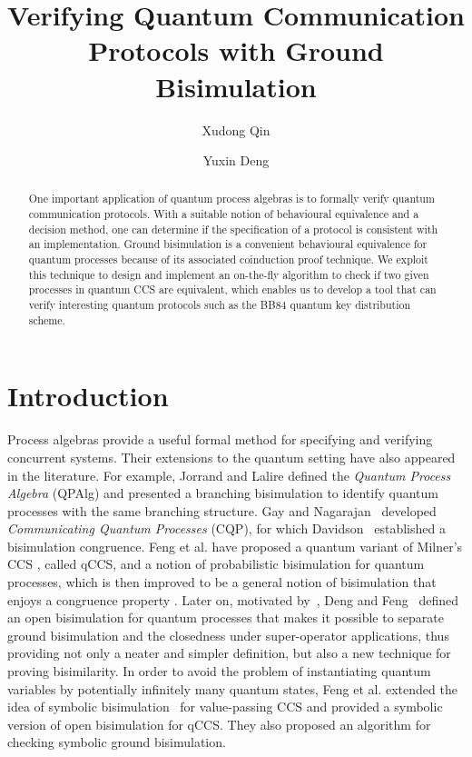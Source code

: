 \documentclass[a4paper,UKenglish,cleveref, autoref]{lipics-v2019}
\title{Verifying Quantum Communication Protocols with Ground Bisimulation}
\author{Xudong Qin}{Shanghai Key Laboratory of Trustworthy Computing, East China Normal University, China}{marsxd@gmail.com}{}{}
\author{Yuxin Deng}{Shanghai Key Laboratory of Trustworthy Computing, East China Normal University, China}{yxdeng@sei.ecnu.edu.cn}{}{}
\begin{document}
\maketitle

\begin{abstract}
	
One important application of quantum process algebras is to formally verify quantum communication protocols. With a suitable notion of behavioural equivalence and a decision method, one can determine if the specification of a protocol is consistent with an implementation. Ground bisimulation is a convenient behavioural equivalence for quantum processes because of its associated coinduction proof technique. We exploit this technique to design and implement an on-the-fly algorithm to check if two given processes in quantum CCS are equivalent, which enables us to develop a tool that can verify interesting quantum protocols such as the BB84 quantum key distribution scheme.
\end{abstract}

\section{Introduction}
\label{sec:introduction}
Process algebras provide a useful formal method for specifying and verifying concurrent systems. Their extensions to the quantum setting have also appeared in the literature. For example, Jorrand and Lalire \cite{JL04,La06} defined the \emph{Quantum Process Algebra} (QPAlg) and presented a branching bisimulation to identify quantum processes with the same branching structure. Gay and Nagarajan~\cite{GN05}  developed \emph{Communicating Quantum Processes} (CQP), for which Davidson~\cite{Da11} established a bisimulation congruence.
Feng et al. \cite{FDJY07} have proposed a quantum variant of  Milner's CCS \cite{ccs}, called qCCS, and a notion of probabilistic bisimulation for quantum processes, which is then improved to be a general notion of bisimulation that enjoys a congruence property \cite{FDY11}. Later on, motivated by~\cite{San96}, Deng and Feng~\cite{DF12} defined an open bisimulation for quantum processes that makes it possible to separate ground bisimulation and the closedness under super-operator applications, thus providing not only a neater and simpler definition, but also a new technique for proving bisimilarity.
In order to avoid the problem of instantiating quantum variables by potentially infinitely many quantum states, Feng et al. \cite{FDY14} extended the idea of symbolic bisimulation~\cite{HL95} for value-passing CCS and provided a 
 symbolic version of open bisimulation for qCCS. They also proposed an algorithm for checking symbolic ground bisimulation.
 
\end{document}
